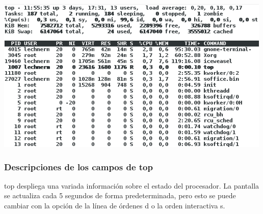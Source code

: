 \documentclass[12pt]{article}
\begin{document}
\begin{center}
 \includegraphics{top.png}
\end{center}

\subsubsection{Descripciones de los campos de top}
       top  despliega  una variada información sobre el estado del procesador.
       La pantalla se actualiza cada 5 segundos de forma predeterminada,  pero
       esto se puede cambiar con la opción de la línea de órdenes d o la orden
       interactiva s.
\end{document}
